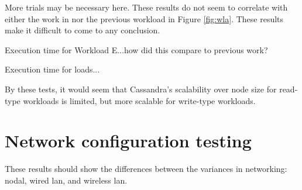 More trials may be necessary here.  These results do not seem to correlate with either the work in \cite{Abramova2014TestingCassandra} nor the previous workload in Figure \ref{fig:wla}.
These results make it difficult to come to any conclusion.

Execution time for Workload E...how did this compare to previous work?

Execution time for loads...

By these tests, it would seem that Cassandra's scalability over node size for read-type workloads is limited, but more scalable for write-type workloads.

\section{Network configuration testing}

These results should show the differences between the variances in networking: nodal, wired \gls{lan}, and wireless \gls{lan}.








